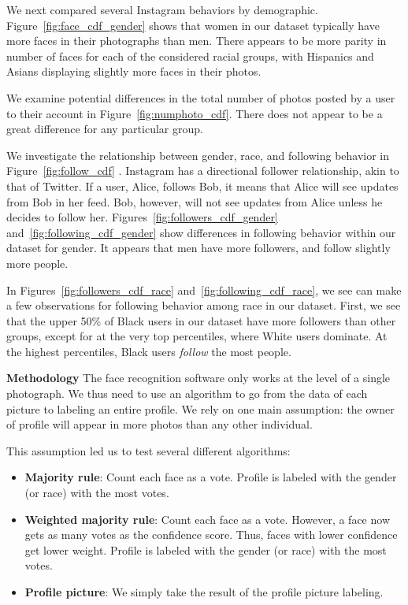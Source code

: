 We next compared several Instagram behaviors by demographic.
Figure~\ref{fig:face_cdf_gender} shows that women in our dataset typically have more faces in their photographs than men.
There appears to be more parity in number of faces for each of the considered racial groups, with Hispanics and Asians displaying slightly more faces in their photos.

We examine potential differences in the total number of photos posted by a user to their account in Figure~\ref{fig:numphoto_cdf}.
There does not appear to be a great difference for any particular group.

We investigate the relationship between gender, race, and following behavior in Figure~\ref{fig:follow_cdf} .
Instagram has a directional follower relationship, akin to that of Twitter.
If a user, Alice, follows Bob, it means that Alice will see updates from Bob in her feed.
Bob, however, will not see updates from Alice unless he decides to follow her.
Figures~\ref{fig:followers_cdf_gender} and~\ref{fig:following_cdf_gender} show differences in following behavior within our dataset for gender. 
It appears that men have more followers, and follow slightly more people.

In Figures~\ref{fig:followers_cdf_race} and~\ref{fig:following_cdf_race}, we see can make a few observations for following behavior among race in our dataset.
First, we see that the upper 50\% of Black users in our dataset have more followers than other groups, except for at the very top percentiles, where White users dominate.
At the highest percentiles, Black users \emph{follow} the most people.



\textbf{Methodology}
The face recognition software only works at the level of a single photograph.
We thus need to use an algorithm to go from the data of each picture to labeling an entire profile.
We rely on one main assumption: the owner of profile will appear in more photos than any other individual.

This assumption led us to test several different algorithms: 
\begin{itemize}
\item \textbf{Majority rule}: Count each face as a vote. 
  Profile is labeled with the gender (or race) with the most votes.
\item \textbf{Weighted majority rule}: Count each face as a vote.
  However, a face now gets as many votes as the confidence score.
  Thus, faces with lower confidence get lower weight.
  Profile is labeled with the gender (or race) with the most votes.
\item \textbf{Profile picture}: We simply take the result of the profile picture labeling.
\end{itemize}

